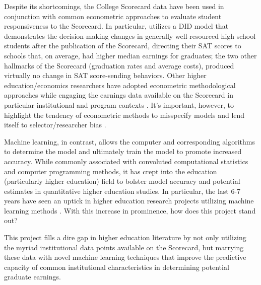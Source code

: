 \documentclass[a4paper, 12pt]{article}
\begin{document}
Despite its shortcomings, the College Scorecard data have been used in
conjunction with common econometric approaches to evaluate student
responsiveness to the Scorecard. In particular, \cite{hurwitz_student_2018}
utilizes a DID model that demonstrates the decision-making changes in
generally well-resourced high school students after the publication of
the Scorecard, directing their SAT scores to schools that, on average,
had higher median earnings for graduates; the two other hallmarks of
the Scorecard (graduation rates and average costs), produced virtually
no change in SAT score-sending behaviors. Other higher
education/economics researchers have adopted econometric
methodological approaches while engaging the earnings data available
on the Scorecard in particular institutional and program contexts
\cite{boland_effect_2021, elu_earnings_2019, mabel_value_2020,
seaman_assessing_2017}. It's important, however, to highlight the
tendency of econometric methods to misspecify models and lend itself to
selector/researcher bias \cite{Imbens_2004}.

Machine learning, in contrast, allows the computer and corresponding
algorithms to determine the model and ultimately train the model to
promote increased accuracy. While commonly associated with convoluted
computational statistics and computer programming methods, it has
crept into the education (particularly higher education) field to
bolster model accuracy and potential estimates in quantitative higher
education studies. In particular, the last 6-7 years have seen an
uptick in higher education research projects utilizing machine
learning methods \cite{aulck2017predicting, savvas_etal_2021, Zeineddine_2021}. 
With this increase in prominence, how does this
project stand out? 

This project fills a dire gap in higher education literature by not
only utilizing the myriad institutional data points available on the
Scorecard, but marrying these data with novel machine learning
techniques that improve the predictive capacity of common
institutional characteristics in determining potential graduate
earnings.

\printbibliography
\end{document}
